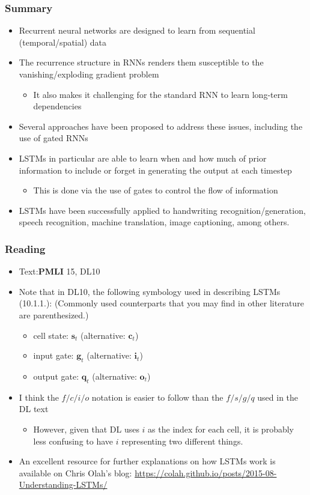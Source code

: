 \documentclass[smaller]{beamer}
\begin{document}
\begin{frame}
  \frametitle{Summary}
  \begin{itemize}
  \item Recurrent neural networks are designed to learn from sequential (temporal/spatial) data
  \item The recurrence structure in RNNs renders them susceptible to the vanishing/exploding gradient problem
    \begin{itemize}
    \item It also makes it challenging for the standard RNN to learn long-term dependencies
    \end{itemize}
  \item Several approaches have been proposed to address these issues, including the use of gated RNNs
  \item LSTMs in particular are able to learn when and how much of prior information to include or forget in generating the output at each timestep
    \begin{itemize}
    \item This is done via the use of gates to control the flow of information
    \end{itemize}
  \item LSTMs have been successfully applied to handwriting recognition/generation, speech recognition, machine translation, image captioning, among others.
  \end{itemize}
\end{frame}
\begin{frame}
  \frametitle{Reading}
  \begin{itemize}
  \item Text:\textbf{PMLI} 15, DL10%
  \item Note that in DL10, the following symbology used in describing LSTMs (10.1.1.): (Commonly used counterparts that you may find in other literature are parenthesized.)
    \begin{itemize}
    \item cell state: $\bm s_{t}$ (alternative: $\bm c_{t}$)
    \item input gate: $\bm g_{t}$ (alternative: $\bm i_{t}$)
    \item output gate: $\bm q_{t}$ (alternative: $\bm o_{t}$)
    \end{itemize}
  \item I think the $f/c/i/o$ notation is easier to follow than the $f/s/g/q$ used in the DL text
    \begin{itemize}
    \item However, given that DL uses $i$ as the index for each cell, it is probably less confusing to have $i$ representing two different things.  
    \end{itemize}
  \item An excellent resource for further explanations on how LSTMs work is available on Chris Olah's blog: \url{https://colah.github.io/posts/2015-08-Understanding-LSTMs/}
  \end{itemize}
\end{frame}
\end{document}

